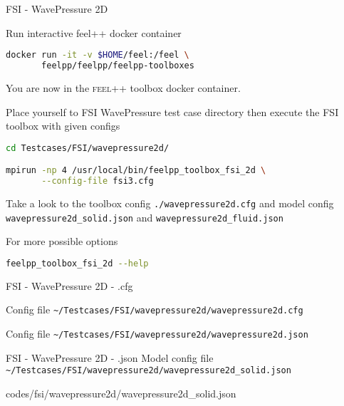 \begin{frame}{FSI - WavePressure 2D}

Run  interactive feel++ docker container

\begin{lstlisting}[language=Bash,mathescape=false,emph={docker}]
docker run -it -v $HOME/feel:/feel \
       feelpp/feelpp/feelpp-toolboxes 
\end{lstlisting}

You are now in the \textsc{feel++} toolbox docker container.

Place yourself to FSI WavePressure test case directory then execute the
FSI toolbox with given configs

\begin{lstlisting}[language=Bash,mathescape=false, emph={feelpp_toolbox_fsi_2d}]
cd Testcases/FSI/wavepressure2d/

mpirun -np 4 /usr/local/bin/feelpp_toolbox_fsi_2d \
       --config-file fsi3.cfg
\end{lstlisting}

Take a look to the toolbox config \lstinline{./wavepressure2d.cfg} and model config
\lstinline{wavepressure2d_solid.json} and \lstinline{wavepressure2d_fluid.json}

For more possible options
\begin{lstlisting}[language=Bash,mathescape=false, emph={feelpp_toolbox_fsi_2d}]
feelpp_toolbox_fsi_2d --help
\end{lstlisting}

\end{frame}


\begin{frame}{FSI - WavePressure 2D - .cfg}

Config file \lstinline{~/Testcases/FSI/wavepressure2d/wavepressure2d.cfg}

\vspace{5mm}
Config file \lstinline{~/Testcases/FSI/wavepressure2d/wavepressure2d.json}


\end{frame}


\begin{frame}{FSI - WavePressure 2D - .json}
Model config file \lstinline{~/Testcases/FSI/wavepressure2d/wavepressure2d_solid.json}
\vspace{5mm}

{codes/fsi/wavepressure2d/wavepressure2d_solid.json}
\end{frame}



